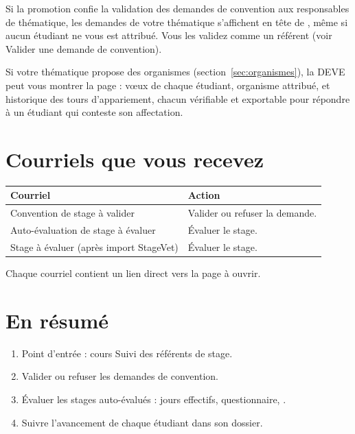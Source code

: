 \documentclass[11pt,a4paper]{article}
\begin{document}
Si la promotion confie la validation des demandes de convention aux responsables
de thématique, les demandes de votre thématique s'affichent en tête de
, même si aucun étudiant ne vous est attribué.
Vous les validez comme un référent (voir \og Valider une demande de convention\fg{}).

Si votre thématique propose des organismes (section~\ref{sec:organismes}), la
DEVE peut vous montrer la page  : vœux de chaque
étudiant, organisme attribué, et historique des tours d'appariement, chacun
vérifiable et exportable pour répondre à un étudiant qui conteste son
affectation.

\section{Courriels que vous recevez}

\begin{center}
\begin{tabularx}{\linewidth}{@{}l X@{}}
\toprule
\textbf{Courriel} & \textbf{Action} \\
\midrule
Convention de stage à valider & Valider ou refuser la demande. \\
Auto-évaluation de stage à évaluer & Évaluer le stage. \\
Stage à évaluer (après import StageVet) & Évaluer le stage. \\
\bottomrule
\end{tabularx}
\end{center}

Chaque courriel contient un lien direct vers la page à ouvrir.

\section{En résumé}

\begin{enumerate}
  \item Point d'entrée : cours \og Suivi des référents de stage\fg{}.
  \item Valider ou refuser les demandes de convention.
  \item Évaluer les stages auto-évalués : jours effectifs, questionnaire,
        .
  \item Suivre l'avancement de chaque étudiant dans son dossier.
\end{enumerate}
\end{document}
